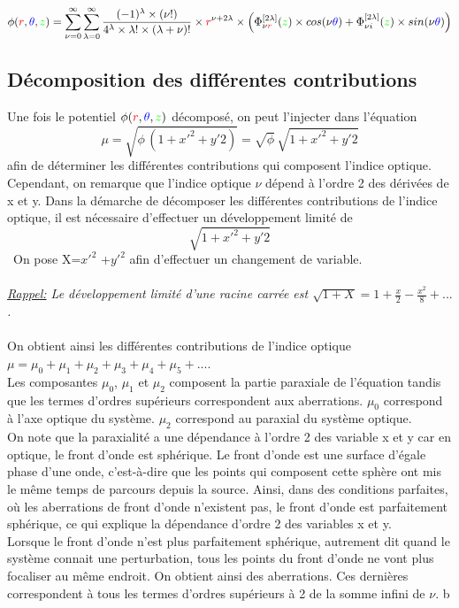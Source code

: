 \documentclass{article}
\begin{document}
\[
\phi ({\color{red}r},{\color{blue}\theta},{\color{green}z})= \sum\limits_{\nu =0}^{\infty}
\sum\limits_{\lambda=0}^{\infty} \frac{(-1)^{\lambda}\times (\nu !)}{4^{\lambda}\times \lambda !\times (\lambda +\nu)!}
\times {\color{red}r}^{\nu +2\lambda} \times \left(\Phi_{\nu {\color{red}r}}^{[2\lambda]}({\color{green}z})\times cos(\nu{\color{blue}\theta}) + 
\Phi_{\nu i}^{[2\lambda]}({\color{green}z})\times sin(\nu{\color{blue}\theta}) \right)
\]
\subsection{Décomposition des différentes contributions}
Une fois le potentiel  $\phi ({\color{red}r},{\color{blue}\theta},{\color{green}z})$ décomposé, on peut l'injecter dans l'équation 
\[
\mu = \sqrt{\phi \, (1+x'^2+y'2)}=\sqrt{\phi} \, \sqrt{1+x'^2+y'2}
\]
afin de déterminer les différentes contributions qui composent l'indice optique. 
\
\\
Cependant, on remarque que l'indice optique $\nu$ dépend à l'ordre 2 des dérivées de x et y. 
Dans la démarche de décomposer les différentes contributions de l'indice optique, il est nécessaire d'effectuer un développement limité de 
\[
\sqrt{1+x'^2+y'2}
\] 
\
On pose X=$x'^2$ +$y'^2$ afin d'effectuer un changement de variable. 
\
\\
\\
{\textit{
{\underline{Rappel:}} 
Le développement limité d'une racine carrée est $\sqrt{1+X}=1+\frac{x}{2}-\frac{x^2}{8}+...$. 
}}
\
\\
\\
On obtient ainsi les différentes contributions de l'indice optique $\mu=\mu_0+\mu_1+\mu_2+\mu_3+\mu_4+\mu_5+...$. 
\
\\
Les composantes $\mu_0$, $\mu_1$ et $\mu_2$ composent la partie paraxiale de l'équation tandis que les 
termes d'ordres supérieurs correspondent aux aberrations. $\mu_0$ correspond à l'axe optique du système. 
$\mu_2$ correspond au paraxial du système optique.  
\
\\
On note que la paraxialité a une dépendance à l'ordre 2 des variable x et y car en optique, le front d'onde est sphérique. Le front d'onde est une surface 
d'égale phase d'une onde, c'est-à-dire que les points qui composent cette sphère ont mis le même temps de parcours depuis la source. Ainsi, dans des conditions parfaites, où les aberrations 
de front d'onde n'existent pas, le front d'onde est parfaitement sphérique, ce qui explique la dépendance d'ordre 2 des variables x et y. 
\\
Lorsque le front d'onde n'est plus parfaitement sphérique, autrement dit quand le système connait une perturbation, tous les points du front d'onde ne vont plus focaliser au même endroit. 
On obtient ainsi des aberrations. Ces dernières correspondent à tous les termes d'ordres supérieurs à 2 de la somme infini de $\nu$. b
\
\end{document}
